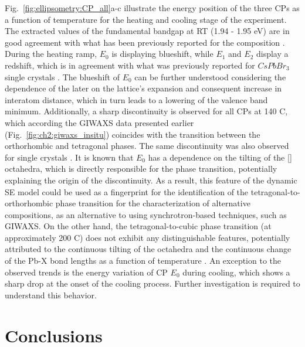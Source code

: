 Fig.~\ref{fig:ellipsometry:CP_all}a-c illustrate the energy position of the three CPs as a function of temperature for the heating and cooling stage of the experiment. The extracted values of the fundamental bandgap at RT (1.94 - 1.95 eV) are in good agreement with what has been previously reported for the  composition \cite{Yuan2021Moisture-stimulatedProperties, Chen2019ThePerovskite,Parida2019Two-stepStability, Igual-Munoz2020Room-TemperaturePrecursors, Mali2021ImplementingCells}. During the heating ramp, $E_0$ is displaying blueshift, while $E_1$ and $E_2$ display a redshift, which is in agreement with what was previously reported for $CsPbBr_3$ single crystals \cite{Ceratti2021CsPbBrsub3/subAir}. The blueshift of $E_0$ can be further understood considering the dependence of the later on the lattice's expansion and consequent increase in interatom distance, which in turn leads to a lowering of the valence band minimum. Additionally, a sharp discontinuity is observed for all CPs at 140 \degree C, which according the GIWAXS data presented earlier (Fig.~\ref{fig:ch2:giwaxs_insitu}) coincides with the transition between the orthorhombic and tetragonal phases. The same discontinuity was also observed for  single crystals \cite{Mannino2020Temperature-DependentCrystals}. It is known that $E_0$ has a dependence on the tilting of the [] octahedra, which is directly responsible for the phase transition, potentially explaining the origin of the discontinuity. As a result, this feature of the dynamic SE model could be used as a fingerprint for the identification of the tetragonal-to-orthorhombic phase transition for the characterization of alternative compositions, as an alternative to using synchrotron-based techniques, such as GIWAXS. On the other hand, the tetragonal-to-cubic phase transition (at approximately 200 \degree C) does not exhibit any distinguishable features, potentially attributed to the continuous tilting of the  octahedra and the continuous change of the Pb-X bond lengths as a function of temperature \cite{Foley2015TemperaturePerovskite}. An exception to the observed trends is the energy variation of CP $E_0$ during cooling, which shows a sharp drop at the onset of the cooling process. Further investigation is required to understand this behavior.



\section{Conclusions}


\cleardoublepage


